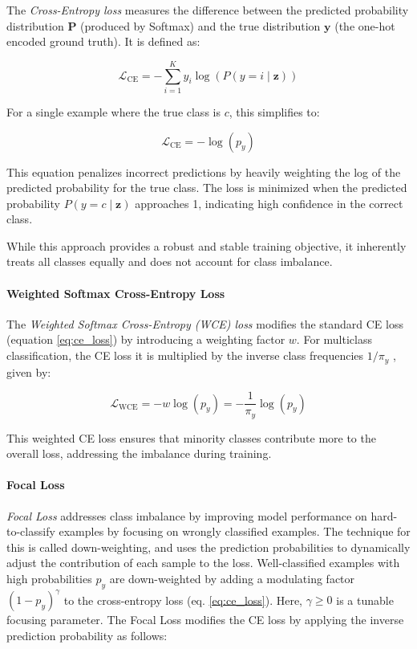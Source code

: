 The \textit{Cross-Entropy loss} measures the difference between the predicted probability distribution \( \mathbf{P} \) (produced by Softmax) and the true distribution \( \mathbf{y} \) (the one-hot encoded ground truth). It is defined as:

\begin{equation}
    \mathcal{L}_{\text{CE}} = -\sum_{i=1}^{K} y_i \log(P(y = i \mid \mathbf{z}))
\end{equation}

For a single example where the true class is \( c \), this simplifies to:

\begin{equation}
    \label{eq:ce_loss}
    \mathcal{L}_{\text{CE}} = -\log(p_y)
\end{equation}

This equation penalizes incorrect predictions by heavily weighting the log of the predicted probability for the true class. The loss is minimized when the predicted probability \( P(y = c \mid \mathbf{z}) \) approaches 1, indicating high confidence in the correct class.

While this approach provides a robust and stable training objective, it inherently treats all classes equally and does not account for class imbalance.


\paragraph{Weighted Softmax Cross-Entropy Loss}
The \emph{Weighted Softmax Cross-Entropy (WCE) loss} modifies the standard CE loss (equation \eqref{eq:ce_loss}) by introducing a weighting factor $w$. For multiclass classification, the CE loss it is multiplied by the inverse class frequencies $1/\pi_y$ \cite{zhang2023deep,lin2018focallossdenseobject}, given by:

\begin{equation}
    \label{eq:wce_loss}
    \mathcal{L}_{\text{WCE}} = -w \log(p_y) = - \frac{1}{\pi_y} \log(p_y)
\end{equation}

This weighted CE loss ensures that minority classes contribute more to the overall loss, addressing the imbalance during training.


\paragraph{Focal Loss}
\emph{Focal Loss} \cite{lin2018focallossdenseobject} addresses class imbalance by improving model performance on hard-to-classify examples by focusing on wrongly classified examples. The technique for this is called down-weighting, and uses the prediction probabilities to dynamically adjust the contribution of each sample to the loss. Well-classified examples with high probabilities $p_y$ are down-weighted by adding a modulating factor $(1 - p_y)^\gamma$ to the cross-entropy loss (eq. \eqref{eq:ce_loss}). Here, $\gamma \geq 0$ is a tunable focusing parameter. The Focal Loss modifies the CE loss by applying the inverse prediction probability as follows:

